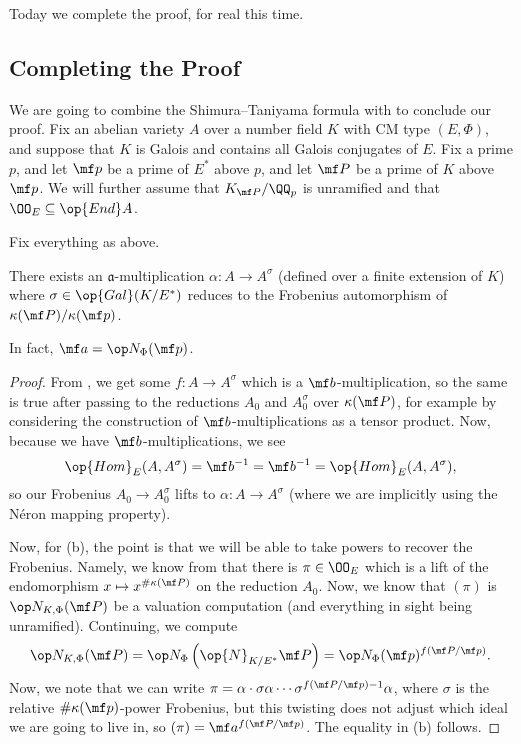 \documentclass[../notes.tex]{subfiles}
\begin{document}
Today we complete the proof, for real this time.

\subsection{Completing the Proof}
We are going to combine the Shimura--Taniyama formula with  to conclude our proof. Fix an abelian variety $A$ over a number field $K$ with CM type $(E,\Phi)$, and suppose that $K$ is Galois and contains all Galois conjugates of $E$. Fix a prime $p$, and let $\mf p$ be a prime of $E^*$ above $p$, and let $\mf P$ be a prime of $K$ above $\mf p$. We will further assume that $K_{\mf P}/\QQ_p$ is unramified and that $\OO_E\subseteq\op{End}A$.
\begin{corollary}
	Fix everything as above.
	\begin{listalph}
		\item There exists an $\mathfrak a$-multiplication $\alpha\colon A\to A^\sigma$ (defined over a finite extension of $K$) where $\sigma\in\op{Gal}(K/E^*)$ reduces to the Frobenius automorphism of $\kappa(\mf P)/\kappa(\mf p)$.
		\item In fact, $\mf a=\op N_\Phi(\mf p)$.
	\end{listalph}
\end{corollary}
\begin{proof}
	From , we get some $f\colon A\to A^\sigma$ which is a $\mf b$-multiplication, so the same is true after passing to the reductions $A_0$ and $A_0^\sigma$ over $\kappa(\mf P)$, for example by considering the construction of $\mf b$-multiplications as a tensor product. Now, because we have $\mf b$-multiplications, we see
	\[\op{Hom}_E(A,A^\sigma)=\mf b^{-1}=\mf b^{-1}=\op{Hom}_E(A,A^\sigma),\]
	so our Frobenius $A_0\to A_0^\sigma$ lifts to $\alpha\colon A\to A^\sigma$ (where we are implicitly using the N\'eron mapping property).

	Now, for (b), the point is that we will be able to take powers to recover the Frobenius. Namely, we know from  that there is $\pi\in\OO_E$ which is a lift of the endomorphism $x\mapsto x^{\#\kappa(\mf P)}$ on the reduction $A_0$. Now, we know that $(\pi)$ is $\op N_{K,\Phi}(\mf P)$ be a valuation computation (and everything in sight being unramified). Continuing, we compute
	\[\op N_{K,\Phi}(\mf P)=\op N_\Phi\left(\op{N}_{K/E^*}\mf P\right)=\op N_\Phi(\mf p)^{f(\mf P/\mf p)}.\]
	Now, we note that we can write $\pi=\alpha\cdot\sigma\alpha\cdots\sigma^{f(\mf P/\mf p)-1}\alpha$, where $\sigma$ is the relative $\#\kappa(\mf p)$-power Frobenius, but this twisting does not adjust which ideal we are going to live in, so $(\pi)=\mf a^{f(\mf P/\mf p)}$. The equality in (b) follows.
\end{proof}
\end{document}
